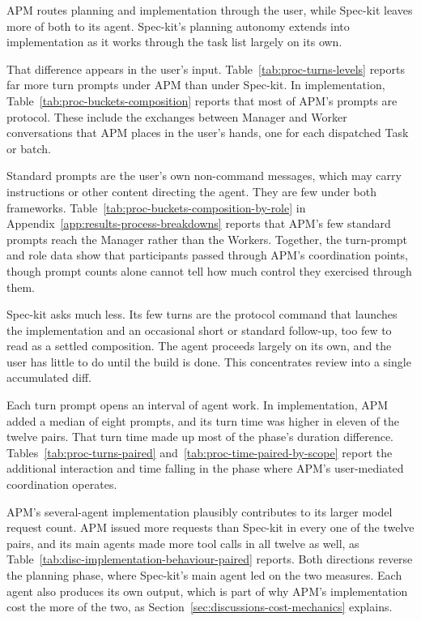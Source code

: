 APM routes planning and implementation through the user, while Spec-kit leaves more of both to its agent. Spec-kit's planning autonomy extends into implementation as it works through the task list largely on its own.

That difference appears in the user's input. Table~\ref{tab:proc-turns-levels} reports far more turn prompts under APM than under Spec-kit. In implementation, Table~\ref{tab:proc-buckets-composition} reports that most of APM's prompts are protocol. These include the exchanges between Manager and Worker conversations that APM places in the user's hands, one for each dispatched Task or batch.

Standard prompts are the user's own non-command messages, which may carry instructions or other content directing the agent. They are few under both frameworks. Table~\ref{tab:proc-buckets-composition-by-role} in Appendix~\ref{app:results-process-breakdowns} reports that APM's few standard prompts reach the Manager rather than the Workers. Together, the turn-prompt and role data show that participants passed through APM's coordination points, though prompt counts alone cannot tell how much control they exercised through them.

Spec-kit asks much less. Its few turns are the protocol command that launches the implementation and an occasional short or standard follow-up, too few to read as a settled composition. The agent proceeds largely on its own, and the user has little to do until the build is done. This concentrates review into a single accumulated diff.

Each turn prompt opens an interval of agent work. In implementation, APM added a median of eight prompts, and its turn time was higher in eleven of the twelve pairs. That turn time made up most of the phase's duration difference. Tables~\ref{tab:proc-turns-paired} and~\ref{tab:proc-time-paired-by-scope} report the additional interaction and time falling in the phase where APM's user-mediated coordination operates.

APM's several-agent implementation plausibly contributes to its larger model request count. APM issued more requests than Spec-kit in every one of the twelve pairs, and its main agents made more tool calls in all twelve as well, as Table~\ref{tab:disc-implementation-behaviour-paired} reports. Both directions reverse the planning phase, where Spec-kit's main agent led on the two measures. Each agent also produces its own output, which is part of why APM's implementation cost the more of the two, as Section~\ref{sec:discussions-cost-mechanics} explains.

